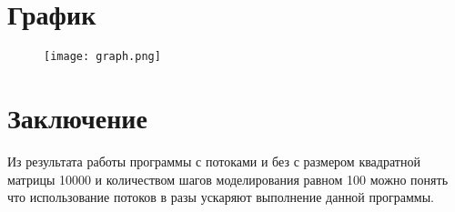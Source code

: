 \documentclass[a4paper, 14pt]{extarticle}
\begin{document}
\section{График}
    
\begin{figure}[H]
	\centering
	\texttt{[image: graph.png]}
\label{fig:picture.png}
\end{figure}

\section{Заключение}

    Из результата работы программы с потоками и без с размером квадратной матрицы 10000 и количеством шагов моделирования равном 100 можно понять что использование потоков в разы ускаряют выполнение данной программы.
\end{document}

